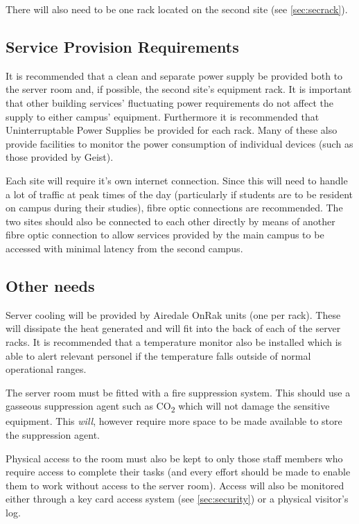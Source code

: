 \documentclass[a4paper, twoside]{article}
\begin{document}
There will also need to be one rack located on the second site (see
\ref{sec:secrack}).

\subsection{Service Provision Requirements}
It is recommended that a clean and separate power supply be provided both to the
server room and, if possible, the second site's equipment rack. It is important
that other building services' fluctuating power requirements do not affect the
supply to either campus' equipment. Furthermore it is recommended that
Uninterruptable Power Supplies be provided for each rack. Many of these also
provide facilities to monitor the power consumption of individual devices (such
as those provided by Geist).

Each site will require it's own internet connection. Since this will need to
handle a lot of traffic at peak times of the day (particularly if students are
to be resident on campus during their studies), fibre optic connections are
recommended. The two sites should also be connected to each other directly by
means of another fibre optic connection to allow services provided by the main
campus to be accessed with minimal latency from the second campus.

\subsection{Other needs}
\label{sec:needs}
Server cooling will be provided by Airedale OnRak units (one per rack). These will dissipate
the heat generated and will fit into the back of each of the server racks. It is
recommended that a temperature monitor also be installed which is able to
alert relevant personel if the temperature falls outside of
normal operational ranges.

The server room must be fitted with a fire suppression system. This should use a
gasseous suppression agent such as CO\textsubscript{2} which will not damage the
sensitive equipment. This \emph{will}, however require more space to be made
available to store the suppression agent\cite{fire}.

Physical access to the room must also be kept to only those staff members who
require access to complete their tasks (and every effort should be made to
enable them to work without access to the server room). Access will also be
monitored either through a key card access system (see \ref{sec:security}) or a
physical visitor's log.
\end{document}
